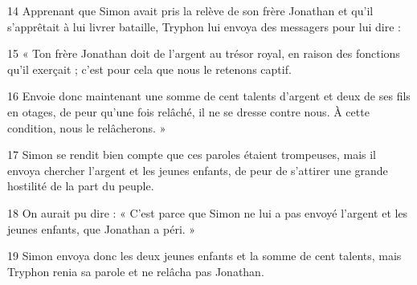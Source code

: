 
14 Apprenant que Simon avait pris la relève de son frère Jonathan et qu’il s’apprêtait à lui livrer bataille, Tryphon lui envoya des messagers pour lui dire :

15 « Ton frère Jonathan doit de l’argent au trésor royal, en raison des fonctions qu’il exerçait ; c’est pour cela que nous le retenons captif.

16 Envoie donc maintenant une somme de cent talents d’argent et deux de ses fils en otages, de peur qu’une fois relâché, il ne se dresse contre nous. À cette condition, nous le relâcherons. »

17 Simon se rendit bien compte que ces paroles étaient trompeuses, mais il envoya chercher l’argent et les jeunes enfants, de peur de s’attirer une grande hostilité de la part du peuple.

18 On aurait pu dire : « C’est parce que Simon ne lui a pas envoyé l’argent et les jeunes enfants, que Jonathan a péri. »

19 Simon envoya donc les deux jeunes enfants et la somme de cent talents, mais Tryphon renia sa parole et ne relâcha pas Jonathan.